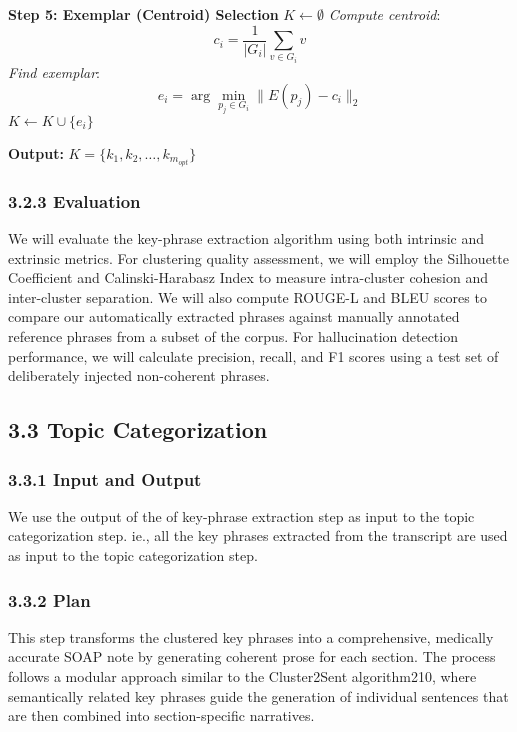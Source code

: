 \documentclass[11pt,a4paper]{article}
\begin{document}
\begin{algorithm}
{\begin{algorithmic}
    \STATE \textbf{Step 5: Exemplar (Centroid) Selection}
    \STATE $K \gets \emptyset$ 
        \STATE \textit{Compute centroid}:
        \[
            c_i = \frac{1}{|G_i|}\sum_{v \in G_i} v
        \]
        \STATE \textit{Find exemplar}: 
        \[
            e_i = \arg\min_{p_j \in G_i} \| E(p_j) - c_i \|_2
        \]
        \STATE $K \gets K \cup \{e_i\}$
    \ENDFOR
    
    \STATE \textbf{Output:} $K = \{k_1, k_2, \ldots, k_{m_{opt}}\}$ 
    
    \end{algorithmic}
    }
    \end{algorithm}
    
\subsubsection*{3.2.3 Evaluation} 
We will evaluate the key-phrase extraction algorithm using both intrinsic and extrinsic metrics. For clustering quality assessment, we will employ the Silhouette Coefficient and Calinski-Harabasz Index to measure intra-cluster cohesion and inter-cluster separation. We will also compute ROUGE-L and BLEU scores to compare our automatically extracted phrases against manually annotated reference phrases from a subset of the corpus. For hallucination detection performance, we will calculate precision, recall, and F1 scores using a test set of deliberately injected non-coherent phrases. 

\subsection*{3.3 Topic Categorization}
\subsubsection*{3.3.1 Input and Output}
We use the output of the of key-phrase extraction step as input to the topic categorization step. ie., all the key phrases extracted from the transcript are used as input to the topic categorization step.
\subsubsection*{3.3.2 Plan}
This step transforms the clustered key phrases into a comprehensive, medically accurate SOAP note by generating coherent prose for each section. The process follows a modular approach similar to the Cluster2Sent algorithm210, where semantically related key phrases guide the generation of individual sentences that are then combined into section-specific narratives.
\end{document}
